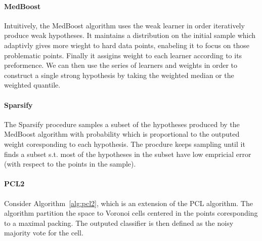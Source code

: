 \paragraph{MedBoost}
Intuitively, the MedBoost algorithm uses the weak learner in order iteratively produce weak hypotheses. It maintains a distribution on the initial sample which adaptivly gives more wieght to hard data points, enabeling it to focus on those problematic points. Finally it assigins weight to each learner according to its preformence. We can then use the series of learners and weights in order to construct a single strong hypothesis by taking the weighted median or the weighted quantile. 

\paragraph{Sparsify}
The Sparsify procedure samples a subset of the hypotheses produced by the MedBoost algorithm with probability which is proportional to the outputed weight coresponding to each hypothesis.
The procdure keeps sampling until it finds a subset s.t. most of the hypotheses in the subset have low empricial error (with respect to the points in the sample).

\paragraph{PCL2}
Consider Algorithm~\ref{alg:pcl2}, which is an extension of the PCL algorithm.
The algorithm partition the space to Voronoi cells centered in the points coresponding to a maximal packing. The outputed classifier is then defined as the noisy majority vote for the cell. 
